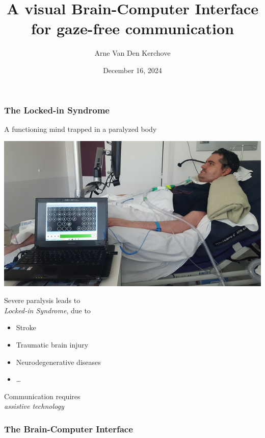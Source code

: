 \documentclass{kul-ulille-beamer}
\title{%
  A visual Brain-Computer Interface \\
  for gaze-free communication
}
\author{Arne Van Den Kerchove}
\date{December 16, 2024}
\begin{document}

\titleframe


\begin{frame}
  \frametitle{The Locked-in Syndrome}
  \centering
  {\Large A functioning mind trapped in a paralyzed  body}
  \bigskip
  \bigskip

  \begin{minipage}[b]{.5\textwidth}
    \includegraphics[width=\textwidth]{figures/intro/damien.jpg}
  \end{minipage}\hfill%
  \begin{minipage}[b]{.4\textwidth}
    Severe paralysis leads to \\
    \emph{Locked-in Syndrome}, due to
    \begin{itemize}
      \item Stroke
      \item Traumatic brain injury
      \item Neurodegenerative diseases
      \item \ldots
    \end{itemize}
  Communication requires \\ \emph{assistive technology}
  \end{minipage}
\end{frame}


%
\begin{frame}
  \frametitle{The Brain-Computer Interface}
\end{frame}
\end{document}
